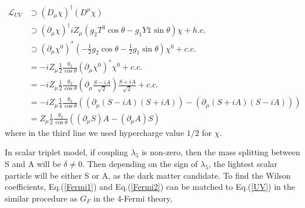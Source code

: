 \documentclass[12pt]{article}
\begin{document}
\begin{equation} \label{UV}
\begin{aligned}
\mathcal L_{UV} 
&
\supset (D_\mu \chi)^\dag(D^\mu \chi) \\
&\supset (\partial_\mu \chi)^\dag  i Z_\mu(g_2 T^3 \cos \theta - g_1 Y \mathbb{1} \sin \theta )\chi + h.c.\\
&\supset
(\partial_\mu \chi^0)^* (-\frac{1}{2} g_2 \cos \theta -\frac{1}{2} g_1   \sin \theta ) \chi^0 + c.c.\\
&= 
- i Z_\mu \frac{1}{2} \frac{g_2}{\cos \theta}(\partial_\mu \chi^0)^* \chi^0  + c.c. \\
&= 
 -i Z_\mu \frac{1}{2} \frac{g_2}{\cos \theta}(\partial_\mu \frac{S-iA}{\sqrt 2}) \frac{S+iA}{\sqrt 2}  + c.c. \\
 &= 
 -i Z_\mu \frac{1}{4} \frac{g_2}{\cos \theta}((\partial_\mu (S-iA) (S+iA))-  (\partial_\mu (S+iA) (S-iA)))\\
  &= 
 Z_\mu \frac{1}{2} \frac{g_2}{\cos \theta}((\partial_\mu S) A-(\partial_\mu A )S)
\end{aligned}
\end{equation}
where in the third line we used hypercharge value $1/2$ for $\chi$. 

In scalar triplet model,  if coupling $\lambda_5$ is non-zero, then the mass splitting between S and A will be $\delta \ne 0$. Then depending on the sign of $\lambda_5$, the lightest scalar particle will be either S or A, as the dark matter candidate. 
To find the Wilson coefficients, Eq.(\ref{Fermi1}) and Eq.(\ref{Fermi2}) can be matched to Eq.(\ref{UV}) in the similar procedure as $G_F$ in the 4-Fermi theory, 
\end{document}
